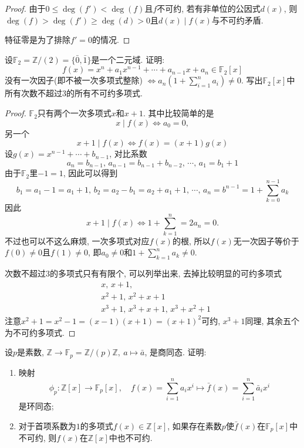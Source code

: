 \documentclass{../solutions-cn}
\begin{document}
\begin{proof}
    由于$0 \leqslant \deg(f') < \deg(f)$且$f$不可约, 若有非单位的公因式$d(x)$, 则$\deg(f) > \deg(f') \geqslant \deg(d) > 0$且$d(x) \mid f(x)$与不可约矛盾.

    特征零是为了排除$f' = 0$的情况.
\end{proof}

\begin{exercise}[习题2.3.5]
    设$\mathbb{F}_2 = \mathbb{Z}/(2) = \{\bar{0}, \bar{1}\}$是一个二元域. 证明: 
    \[
        f(x) = x^n + a_1x^{n - 1} + \cdots + a_{n - 1}x + a_n \in \mathbb{F}_2[x]
    \]
    没有一次因子(即不被一次多项式整除)
    \(
        \Leftrightarrow a_n\left(1 + \sum_{i = 1}^n a_i\right) \neq 0.
    \)
    写出$\mathbb{F}_2[x]$中所有次数不超过$3$的所有不可约多项式.
\end{exercise}

\begin{proof}
    $\mathbb{F}_2$只有两个一次多项式$x$和$x + 1$. 其中比较简单的是
    \[
        x \mid f(x) \iff a_0 = 0,
    \]
    另一个
    \[
        x + 1 \mid f(x) \iff f(x) = (x + 1)g(x)
    \]
    设$g(x) = x^{n - 1} + \cdots + b_{n - 1}$, 对比系数
    \[
        a_n = b_{n - 1},\, a_{n - 1} = b_{n - 1} + b_{n - 2},\, \cdots,\, a_{1} = b_1 + 1
    \]
    由于$\mathbb{F}_2$里$-1 = 1$, 因此可以得到
    \[
        b_1 = a_1 - 1 = a_1 + 1,\, b_2 = a_2 - b_1 = a_2 + a_1 + 1,\, \cdots,\, a_n = b^{n - 1} = 1 + \sum_{k = 0}^{n - 1} a_k
    \]
    因此
    \[
        x + 1 \mid f(x) \iff 1 + \sum_{k = 1}^{n} = 2a_n = 0.
    \]
    不过也可以不这么麻烦, 一次多项式对应$f(x)$的根, 所以$f(x)$无一次因子等价于$f(0) \neq 0$且$f(1) \neq 0$, 即$a_0 \neq 0$和$1 + \sum_{k = 1}^{n} a_k \neq 0$.

    次数不超过$3$的多项式只有有限个, 可以列举出来, 去掉比较明显的可约多项式
    \[
    \begin{aligned}
        &x,\, x + 1,\\
        &x^2 + 1,\, x^2 + x + 1\\
        &x^3 + 1,\, x^3 + x + 1,\, x^3 + x^2 + 1
    \end{aligned}
    \]
    注意$x^2 + 1 = x^2 - 1 = (x - 1)(x + 1) = (x + 1)^2$可约, $x^3 + 1$同理, 其余五个为不可约多项式.
\end{proof}

\begin{exercise}[习题2.3.6]
    设$p$是素数, $\mathbb{Z} \to \mathbb{F}_p = \mathbb{Z}/(p)\mathbb{Z},~a \mapsto \bar{a}$, 是商同态. 证明: 
    \begin{enumerate}[(1)]
        \item 映射
        \[
            \phi_p:\mathbb{Z}[x] \to \mathbb{F}_p[x],\quad f(x) = \sum_{i = 1}^n a_ix^i \mapsto \bar{f}(x) = \sum_{i = 1}^n \bar{a}_ix^i
        \]
        是环同态;
        \item 对于首项系数为$1$的多项式$f(x) \in \mathbb{Z}[x]$, 如果存在素数$p$使$\bar{f}(x)$在$\mathbb{F}_p[x]$中不可约, 则$f(x)$在$\mathbb{Z}[x]$中也不可约.
    \end{enumerate}
\end{exercise}
\end{document}
